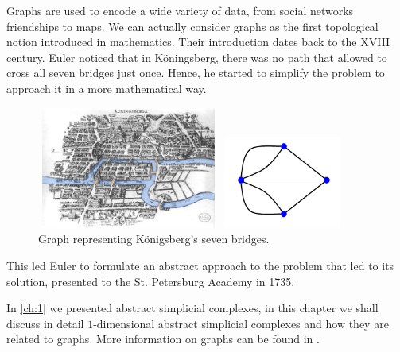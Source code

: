 \documentclass[../2.tex]{subfiles}
\begin{document}
    Graphs are used to encode a wide variety of data, from social networks friendships to maps.    
    We can actually consider graphs as the first topological notion introduced in mathematics.
    Their introduction dates back to the XVIII century.
    Euler noticed that in K{\"o}ningsberg, there was no path that 
    allowed to cross all seven bridges just once. Hence, he started to simplify the problem to approach it in a more mathematical 
    way.
    \begin{figure}[H]
        \begin{minipage}{.5\textwidth}
            \centering
            \includegraphics[width=6cm, height=4cm]{sections/2/Bridge}
            \caption{The city of K{\"o}nigsberg and the\\ seven bridges.}
            \label{fig:2:1}
        \end{minipage}
        \begin{minipage}{.5\textwidth}
            \centering
            \includegraphics[width=4cm, height=3cm]{sections/2/kgraph}
            \caption{Graph representing K{\"o}nigsberg's seven bridges.}
            \label{fig:2:2}
        \end{minipage}
    \end{figure}

    This led Euler to formulate an abstract approach to the problem that led to its solution, presented to the St. Petersburg
    Academy in 1735.

    In \autoref{ch:1} we presented abstract simplicial complexes, in this chapter we shall discuss in detail
    $1$-dimensional abstract simplicial complexes and how they are related to graphs. More information
    on graphs can be found in \cite{bondy}.
\end{document}

